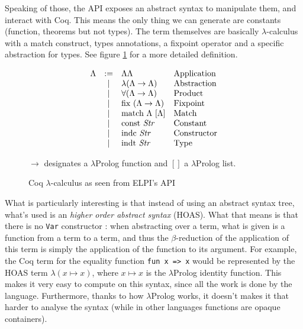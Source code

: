 \documentclass{article}
\newcommand{\lprog}{$\lambda$Prolog }
\begin{document}
Speaking of those, the API exposes an abstract syntax to manipulate them, and
interact with Coq. This means the only thing we can generate are constants
(function, theorems but not types). The term themselves are basically
$\lambda$-calculus with a match construct, types annotations, a fixpoint operator
and a specific abstraction for types. See figure \ref{LambdaCoq} for a more
detailed definition.

\begin{figure}
    \[\begin{array}{rcll}
        \Lambda & := & \Lambda\Lambda & \text{Application} \\
                & |  & \lambda (\Lambda \rightarrow \Lambda) & \text{Abstraction} \\
                & |  & \forall (\Lambda \rightarrow \Lambda) & \text{Product} \\
                & |  & \text{fix } (\Lambda \rightarrow \Lambda) & \text{Fixpoint} \\
                & |  & \text{match } \Lambda\ [\Lambda] & \text{Match} \\
                & |  & \text{const \emph{Str}} & \text{Constant} \\
                & |  & \text{indc \emph{Str}}  & \text{Constructor} \\
                & |  & \text{indt \emph{Str}}  & \text{Type} \\
    \end{array}\]
    \begin{center}$\rightarrow$ designates a \lprog function and $[]$ a \lprog list.\end{center}
    \caption{Coq $\lambda$-calculus as seen from ELPI's API}
    \label{LambdaCoq}
\end{figure}

What is particularly interesting is that instead of using an abstract syntax tree,
what's used is an \emph{higher order abstract syntax} (HOAS). What that means is
that there is no \texttt{Var} constructor : when abstracting over a term, what
is given is a function from a term to a term, and thus the $\beta$-reduction
of the application of this term is simply the application of the function to
its argument. For example, the Coq term for the equality function \texttt{fun x => x}
would be represented by the HOAS term $\lambda (x \mapsto x)$, where $x\mapsto x$
is the \lprog identity function. This makes it very easy to compute on this syntax,
since all the work is done by the language. Furthermore, thanks to how \lprog works,
it doesn't makes it that harder to analyse the syntax (while in other languages
functions are opaque containers).
\end{document}
